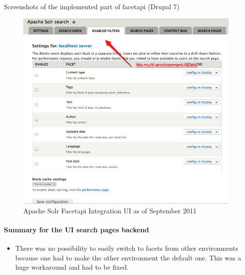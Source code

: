 Screenshots of the implemented part of facetapi (Drupal 7)
\begin{figure}[H]
     \includegraphics[width=\textwidth]{images/facetapI_ui_september_2011.jpg}
     \caption{Apache Solr Facetapi Integration UI as of September 2011}
\end{figure}
\paragraph{Summary for the UI search pages backend}
\begin{itemize}
\item There was no possibility to easily switch to facets from other environments because one had to make the other environment the default one. This was a huge workaround and had to be fixed.
\end{itemize}

